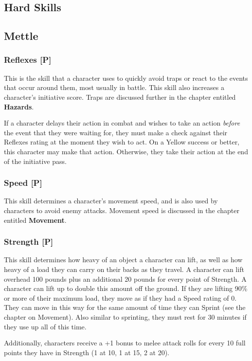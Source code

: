 \documentclass[oneside]{book}
\begin{document}
\begin{multicols}{2}

\section{Hard Skills}
\subsection{Mettle}
\subsubsection{Reflexes [P]}
This is the skill that a character uses to quickly avoid traps or react to the events that occur around them, most usually in battle. This skill also increases a character's initiative score. Traps are discussed further in the chapter entitled \textbf{Hazards}.

If a character delays their action in combat and wishes to take an action \emph{before} the event that they were waiting for, they must make a check against their Reflexes rating at the moment they wish to act. On a Yellow success or better, this character may make that action. Otherwise, they take their action at the end of the initiative pass.

\subsubsection{Speed [P]}
This skill determines a character's movement speed, and is also used by characters to avoid enemy attacks. Movement speed is discussed in the chapter entitled \textbf{Movement}.

\subsubsection{Strength [P]}
This skill determines how heavy of an object a character can lift, as well as how heavy of a load they can carry on their backs as they travel. A character can lift overhead 100 pounds plus an additional 20 pounds for every point of Strength. A character can lift up to double this amount off the ground. If they are lifting 90\% or more of their maximum load, they move as if they had a Speed rating of 0. They can move in this way for the same amount of time they can Sprint (see the chapter on Movement). Also similar to sprinting, they must rest for 30 minutes if they use up all of this time.  

Additionally, characters receive a +1 bonus to melee attack rolls for every 10 full points they have in Strength (1 at 10, 1 at 15, 2 at 20).


\end{multicols}
\end{document}
